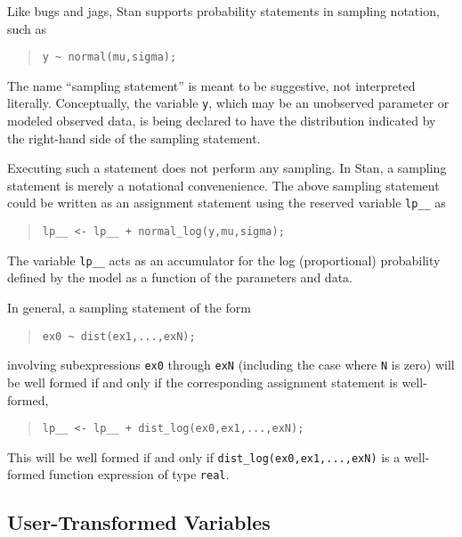 \documentclass[10pt]{report}
\newcommand{\Stan}{Stan\xspace}
\newcommand{\acronym}[1]{{\sc #1}\xspace}
\newcommand{\BUGS}{\acronym{bugs}}
\newcommand{\JAGS}{\acronym{jags}}
\newcommand{\code}[1]{{\tt #1}}
\begin{document}
Like \BUGS and \JAGS, \Stan supports probability statements in
sampling notation, such as
%
\begin{quote}
\begin{Verbatim}
y ~ normal(mu,sigma);
\end{Verbatim}
\end{quote}
%
The name ``sampling statement'' is meant to be suggestive, not
interpreted literally.  Conceptually, the variable \code{y}, which may
be an unobserved parameter or modeled observed data, is being declared
to have the distribution indicated by the right-hand side of the
sampling statement.

Executing such a statement does not perform any sampling.  In \Stan, a
sampling statement is merely a notational convenenience.  The above
sampling statement could be written as an assignment statement using
the reserved variable \code{lp\_\_} as
%
\begin{quote}
\begin{Verbatim}
lp__ <- lp__ + normal_log(y,mu,sigma);
\end{Verbatim}
\end{quote}
%
The variable \code{lp\_\_} acts as an accumulator for the log
(proportional) probability defined by the model as a function of the
parameters and data.

In general, a sampling statement of the form
%
\begin{quote}
\begin{Verbatim}
ex0 ~ dist(ex1,...,exN);
\end{Verbatim}
\end{quote}
%
involving subexpressions \code{ex0} through \code{exN} (including the
case where \code{N} is zero) will be well formed if and only if the
corresponding assignment statement is well-formed,
%
\begin{quote}
\begin{Verbatim}
lp__ <- lp__ + dist_log(ex0,ex1,...,exN);
\end{Verbatim}
\end{quote}
%
This will be well formed if and only if
\code{dist\_log(ex0,ex1,...,exN)} is a well-formed function expression
of type \code{real}.

\subsection{User-Transformed Variables}
\end{document}
